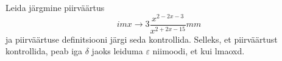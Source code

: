 \documentclass{article}
\begin{document}
Leida järgmine piirväärtus
\[ imx\to3 \frac{x^{2-2x-3}}{x^{2+2x-15}} mm\] 
ja piirväärtuse definitsiooni järgi seda kontrollida. Selleks, et piirväärtust kontrollida, peab iga $\delta$ jaoks leiduma $\varepsilon$ niimoodi, et kui lmaoxd.
\end{document}
